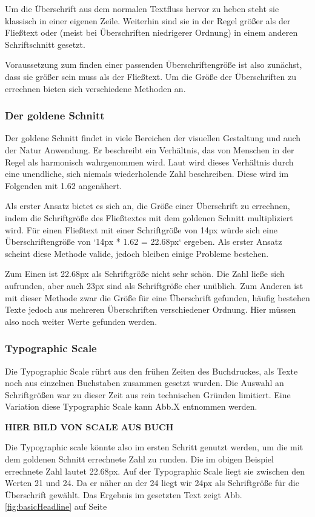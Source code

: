 Um die Überschrift aus dem normalen Textfluss hervor zu heben steht sie klassisch in einer eigenen Zeile. Weiterhin sind sie in der Regel größer als der Fließtext oder (meist bei Überschriften niedrigerer Ordnung) in einem anderen Schriftschnitt gesetzt.

Voraussetzung zum finden einer passenden Überschriftengröße ist also zunächst, dass sie größer sein muss als der Fließtext. Um die Größe der Überschriften zu errechnen bieten sich verschiedene Methoden an.

\subsubsection{Der goldene Schnitt}
Der goldene Schnitt findet in viele Bereichen der visuellen Gestaltung und auch der Natur Anwendung. Er beschreibt ein Verhältnis, das von Menschen in der Regel als harmonisch wahrgenommen wird.
Laut \cite{livio2003golden} wird dieses Verhältnis durch eine unendliche, sich niemals wiederholende Zahl beschreiben. Diese wird im Folgenden mit 1.62 angenähert.

Als erster Ansatz bietet es sich an, die Größe einer Überschrift zu errechnen, indem die Schriftgröße des Fließtextes mit dem goldenen Schnitt multipliziert wird.
Für einen Fließtext mit einer Schriftgröße von 14px würde sich eine Überschriftengröße von `14px * 1.62 = 22.68px` ergeben.
Als erster Ansatz scheint diese Methode valide, jedoch bleiben einige Probleme bestehen.

Zum Einen ist 22.68px als Schriftgröße nicht sehr schön. Die Zahl ließe sich aufrunden, aber auch 23px sind als Schriftgröße eher unüblich.
Zum Anderen ist mit dieser Methode zwar die Größe für eine Überschrift gefunden, häufig bestehen Texte jedoch aus mehreren Überschriften verschiedener Ordnung. Hier müssen also noch weiter Werte gefunden werden.

\subsubsection{Typographic Scale}
Die Typographic Scale rührt aus den frühen Zeiten des Buchdruckes, als Texte noch aus einzelnen Buchstaben zusammen gesetzt wurden. Die Auswahl an Schriftgrößen war zu dieser Zeit aus rein technischen Gründen limitiert. Eine Variation diese Typographic Scale kann Abb.X entnommen werden.

\textbf{HIER BILD VON SCALE AUS BUCH}

Die Typographic scale könnte also im ersten Schritt genutzt werden, um die mit dem goldenen Schnitt errechnete Zahl zu runden.
Die im obigen Beispiel errechnete Zahl lautet 22.68px. Auf der Typographic Scale liegt sie zwischen den Werten 21 und 24. Da er näher an der 24 liegt wir 24px als Schriftgröße für die Überschrift gewählt. Das Ergebnis im gesetzten Text zeigt Abb. \ref{fig:basicHeadline} auf Seite \pageref{fig:basicHeadline}

